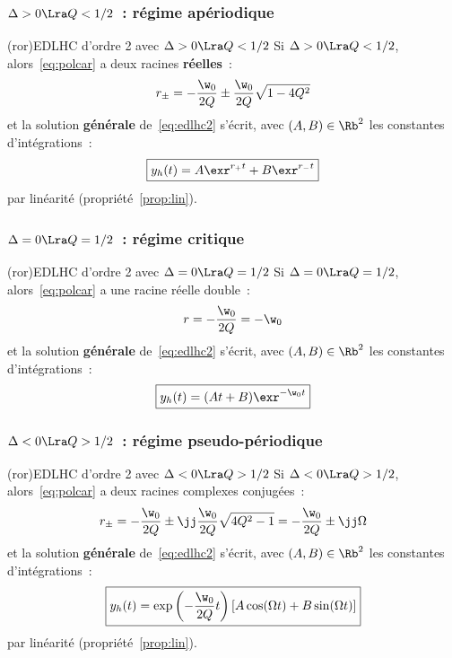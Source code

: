 \documentclass[a4paper, 11pt, garamond]{book}
\begin{document}
\subsubsection{$\Delta > 0 \Lra Q <1/2$~: régime apériodique}
\begin{tcn}(ror){EDLHC d'ordre 2 avec $\Delta > 0 \Lra Q <1/2$}
	Si $\Delta > 0 \Lra Q < 1/2$, alors~\eqref{eq:polcar} a deux racines
	\textbf{réelles}~:
	\[
		r_{\pm} = -\frac{\w_0}{2Q} \pm \frac{\w_0}{2Q} \sqrt{1-4Q^{2}}
	\]
	et la solution \textbf{générale} de~\eqref{eq:edlhc2} s'écrit, avec $(A,B) \in
		\Rb^{2}$ les constantes d'intégrations~:
	\[
		\boxed{y_h(t) = A\exr^{r_+t} + B\exr^{r_-t}}
	\]
	par linéarité (propriété~\ref{prop:lin}).
\end{tcn}

\subsubsection{$\Delta = 0 \Lra Q=1/2$~: régime critique}
\begin{tcn}(ror){EDLHC d'ordre 2 avec $\Delta = 0 \Lra Q=1/2$}
	Si $\Delta = 0 \Lra Q = 1/2$, alors~\eqref{eq:polcar} a une racine réelle
	double~:
	\[
		r = -\frac{\w_0}{2Q} = -\w_0
	\]
	et la solution \textbf{générale} de~\eqref{eq:edlhc2} s'écrit, avec $(A,B) \in
		\Rb^{2}$ les constantes d'intégrations~:
	\[
		\boxed{y_h(t) = (At + B)\exr^{-\w_0t}}
	\]
\end{tcn}

\subsubsection{$\Delta < 0 \Lra Q>1/2$~: régime pseudo-périodique}
\begin{tcn}(ror){EDLHC d'ordre 2 avec $\Delta < 0 \Lra Q>1/2$}
	Si $\Delta < 0 \Lra Q > 1/2$, alors~\eqref{eq:polcar} a deux racines complexes
	conjugées~:
	\[
		r_{\pm} =
		-\frac{\w_0}{2Q} \pm \jj \frac{\w_0}{2Q} \sqrt{4Q^{2}-1} =
		-\frac{\w_0}{2Q} \pm \jj \Omega
	\]
	et la solution \textbf{générale} de~\eqref{eq:edlhc2} s'écrit, avec $(A,B) \in
		\Rb^{2}$ les constantes d'intégrations~:
	\[
		\boxed{
			y_h(t) = \exp\left( -\frac{\w_0}{2Q}t \right)
			\left[A\cos(\Omega t) + B\sin(\Omega t)\right]
		}
	\]
	par linéarité (propriété~\ref{prop:lin}).
\end{tcn}
\end{document}
